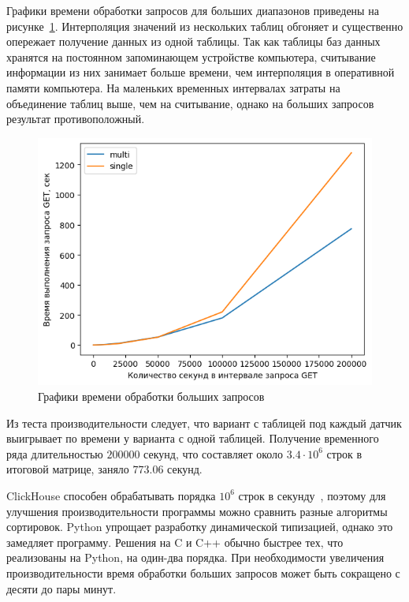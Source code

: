 Графики времени обработки запросов для больших диапазонов приведены на рисунке~\ref{bench2e5}. Интерполяция значений из нескольких таблиц обгоняет и существенно опережает получение данных из одной таблицы. Так как таблицы баз данных хранятся на постоянном запоминающем устройстве компьютера, считывание информации из них занимает больше времени, чем интерполяция в оперативной памяти компьютера. На маленьких временных интервалах затраты на объединение таблиц выше, чем на считывание, однако на больших запросов результат противоположный.

\begin{figure}
    \includegraphics[scale=1.0]{../img/bench2e5.png}
    \caption{Графики времени обработки больших запросов}
    \label{bench2e5}
\end{figure}

Из теста производительности следует, что вариант с таблицей под каждый датчик выигрывает по времени у варианта с одной таблицей. Получение временного ряда длительностью $200000$ секунд, что составляет около $3.4 \cdot {10} ^ {6}$ строк в итоговой матрице, заняло $773.06$ секунд.

ClickHouse способен обрабатывать порядка ${10} ^ {6}$ строк в секунду~\cite{ch-perfomance}, поэтому для улучшения производительности программы можно сравнить разные алгоритмы сортировок. Python упрощает разработку динамической типизацией, однако это замедляет программу. Решения на C и C++ обычно быстрее тех, что реализованы на Python, на один-два порядка. При необходимости увеличения производительности время обработки больших запросов может быть сокращено с десяти до пары минут.
